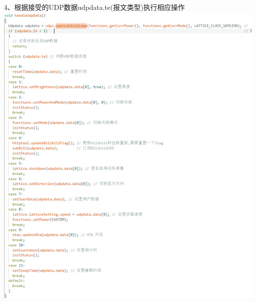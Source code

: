\documentclass[16pt]{beamer}	%
\begin{document}
	  \begin{frame}
	 	4、根据接受的UDP数据udpdata.te(报文类型)执行相应操作
	 		\centering \includegraphics[height=\paperheight]{pic/2-6.png} 
	 \end{frame}
		
\end{document}
